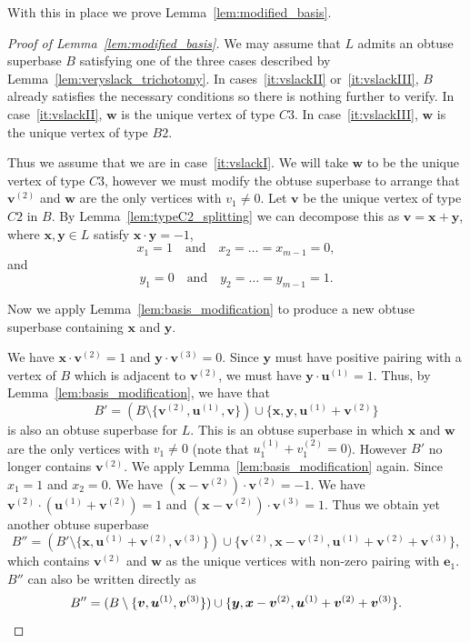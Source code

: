 \documentclass{amsart} %
\newcommand{\e}{\bm{e}}
\newcommand{\bv}{\bm{v}}
\newcommand{\bu}{\bm{u}}
\theoremstyle{thm}
\theoremstyle{definition}
\numberwithin{equation}{section}
\begin{document}
With this in place we prove Lemma~\ref{lem:modified_basis}.
\begin{proof}[Proof of Lemma~\ref{lem:modified_basis}]
We may assume that $L$ admits an obtuse superbase $B$ satisfying one of the three cases described by Lemma~\ref{lem:veryslack_trichotomy}.
In cases~\ref{it:vslackII} or~\ref{it:vslackIII}, $B$ already satisfies the necessary conditions so there is nothing further to verify. In case~\eqref{it:vslackII}, $\bm{w}$ is the unique vertex of type $C3$. In case~\ref{it:vslackIII}, $\bm{w}$ is the unique vertex of type $B2$.

Thus we assume that we are in case~\ref{it:vslackI}. We will take $\bm{w}$ to be the unique vertex of type $C3$, however we must modify the obtuse superbase to arrange that $\bv^{(2)}$ and $\bm{w}$ are the only vertices with $v_1 \neq 0$. Let $\bv$ be the unique vertex of type $C2$ in $B$. By Lemma~\ref{lem:typeC2_splitting} we can decompose this as $\bv=\bm{x}+\bm{y}$, where $\bm{x},\bm{y}\in L$ satisfy $\bm{x}\cdot \bm{y} =-1$, 
\[x_1 = 1 \quad \text{and}\quad x_2 = \dots = x_{m-1}=0,
\]
and
\[y_1 = 0 \quad \text{and}\quad y_2 = \dots = y_{m-1}=1.
\]

Now we apply Lemma~\ref{lem:basis_modification} to produce a new obtuse superbase containing $\bm{x}$ and $\bm{y}$.

We have $\bm{x}\cdot \bv^{(2)} =1$ and $\bm{y}\cdot \bv^{(3)}=0$. Since $\bm{y}$ must have positive pairing with a vertex of $B$ which is adjacent to $\bv^{(2)}$, we must have $\bm{y}\cdot \bu^{(1)} =1$. Thus, by Lemma~\ref{lem:basis_modification}, we have that
\[
B'= (B\setminus\{\bv^{(2)}, \bu^{(1)}, \bv \})\cup \{\bm{x}, \bm{y} ,\bu^{(1)}+\bv^{(2)} \}
\]
is also an obtuse superbase for $L$. This is an obtuse superbase in which $\bm{x}$ and $\bm{w}$ are the only vertices with $v_1 \neq 0$ (note that $u_1^{(1)}+v_1^{(2)}=0$). However $B'$ no longer contains $\bv^{(2)}$. We apply Lemma~\ref{lem:basis_modification} again. Since $x_1=1$ and $x_2=0$. We have $(\bm{x}-\bv^{(2)})\cdot \bv^{(2)}=-1$. We have $\bv^{(2)}\cdot (\bu^{(1)}+\bv^{(2)})=1$ and $(\bm{x}-\bv^{(2)})\cdot \bv^{(3)}=1$. Thus we obtain yet another obtuse superbase
\[
B''= (B' \setminus\{\bm{x},\bu^{(1)}+\bv^{(2)},\bv^{(3)} \})\cup \{\bv^{(2)}, \bm{x}-\bv^{(2)}, \bu^{(1)}+\bv^{(2)}+\bv^{(3)}\},
\]
which contains $\bv^{(2)}$ and $\bm{w}$ as the unique vertices with non-zero pairing with $\e_1$. $B''$ can also be written directly as 
\[
B''= (B \setminus\{\bv,\bu^{(1)},\bv^{(3)} \})\cup \{\bm{y}, \bm{x}-\bv^{(2)}, \bu^{(1)}+\bv^{(2)}+\bv^{(3)}\}.\qedhere
\]
\end{proof}
\end{document}
